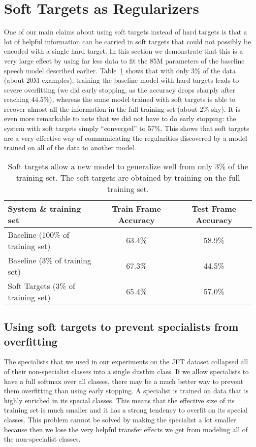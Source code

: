\section{Soft Targets as Regularizers}

One of our main claims about using soft targets instead of hard targets is that a lot of helpful information can be
carried in soft targets that could not possibly be encoded with a single hard target. In this section we demonstrate
that this is a very large effect by using far less data to fit the 85M
parameters of the baseline speech
model described earlier.  Table~\ref{tab:small} shows that with only 3\% of the data (about 20M examples), training the baseline model with
hard targets leads to severe overfitting (we did early stopping, as the accuracy drops sharply after reaching 44.5\%),
whereas the same model trained with soft targets is able to recover almost all the information in the full training set
(about 2\% shy). It is even more remarkable to note that we did not have to do early stopping: the system with soft
targets simply ``converged'' to 57\%. This shows that soft targets are a very effective way of communicating the
regularities discovered by a model trained on all of the data to another model.

\begin{table}
\centering
\small
\begin{tabular}{|l|c|c|}
\hline
System \& training set & Train Frame Accuracy & Test Frame Accuracy \\
\hline
Baseline (100\% of training set) & 63.4\% & 58.9\% \\
Baseline (3\% of training set) & 67.3\%& 44.5\% \\
Soft Targets (3\% of training set) & 65.4\%& 57.0\%\\
\hline
\end{tabular}
\caption{Soft targets allow a new model to generalize well from only 3\% of the
  training set. The soft targets are obtained by training on the full training set.}\label{tab:small}
\end{table}


\subsection{Using soft targets to prevent specialists from
  overfitting}

The specialists that we used in our experiments on the JFT dataset
collapsed all of their non-specialist classes into a single dustbin
class. If we allow specialists to have a full softmax over all
classes, there may be a much better way to prevent them overfitting than using
early stopping. A specialist is trained on data that is highly
enriched in its special classes.  This means that the effective size
of its training set is much smaller and it has a strong tendency to
overfit on its special classes. This problem cannot be solved by
making the specialist a lot smaller because then we lose the very
helpful transfer effects we get from modeling all of the
non-specialist classes. 


